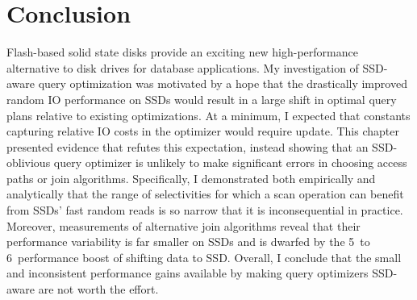 \section{Conclusion}
\label{sec:FlashOpti:Conclusion}
Flash-based solid state disks provide an exciting new high-performance alternative to disk drives for database applications.
My investigation of SSD-aware query optimization was motivated by a hope that the drastically improved random IO performance on SSDs would result in a large shift in optimal query plans relative to existing optimizations.
At a minimum, I expected that constants capturing relative IO costs in the optimizer would require update.
This chapter presented evidence that refutes this expectation, instead showing that an SSD-oblivious query optimizer is unlikely to make significant errors in choosing access paths or join algorithms.
Specifically, I demonstrated both empirically and analytically that the range of selectivities for which a scan operation can benefit from SSDs' fast random reads is so narrow that it is inconsequential in practice.
Moreover, measurements of alternative join algorithms reveal that their performance variability is far smaller on SSDs and is dwarfed by the 5\texttimes~to 6\texttimes~performance boost of shifting data to SSD. 
Overall, I conclude that the small and inconsistent performance gains available by making query optimizers SSD-aware are not worth the effort.
